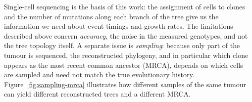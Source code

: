 Single-cell sequencing is the basis of this work: the assignment of cells to clones
and the number of mutations along each branch of the tree give us the information we
need about event timings and growth rates. The limitations described above concern
\emph{accuracy}, the noise in the measured genotypes, and not the tree topology
itself. A separate issue is \emph{sampling}: because only part of the tumour is
sequenced, the reconstructed phylogeny, and in particular which clone appears as the
most recent common ancestor (MRCA), depends on which cells are sampled and need not
match the true evolutionary history. Figure~\ref{fig:sampling-mrca} illustrates how
different samples of the same tumour can yield different reconstructed trees and a
different MRCA.


\newcommand{\cells}[2]{\fill[black!75] (#1-0.18,#2-0.6) circle(.6mm);\fill[black!75] (#1,#2-0.64) circle(.6mm);\fill[black!75] (#1+0.18,#2-0.6) circle(.6mm);}
\newcommand{\cn}[4]{\filldraw[fill=#3,draw=#3!55!black,line width=.4pt] (#1,#2) circle(3.5mm);\node[text=white,font=\bfseries\small] at (#1,#2){#4};}
\newcommand{\sn}[4]{\filldraw[fill=#3,draw=black,line width=1.2pt] (#1,#2) circle(3.5mm);\node[text=white,font=\bfseries\small] at (#1,#2){#4};\cells{#1}{#2}}
\newcommand{\fn}[4]{\filldraw[fill=#3,fill opacity=0.22,draw=gray,dashed,line width=.4pt] (#1,#2) circle(3.5mm);\node[text=white,opacity=0.45,font=\bfseries\small] at (#1,#2){#4};}
\newcommand{\eg}[4]{\draw[line width=.7pt,black!50] (#1,#2)--(#3,#4);}
\newcommand{\fe}[4]{\draw[line width=.7pt,black!50,opacity=0.22,dashed] (#1,#2)--(#3,#4);}
\newcommand{\mr}[2]{\draw[mrcacol,line width=1.2pt] (#1,#2) circle(5.5mm);}

